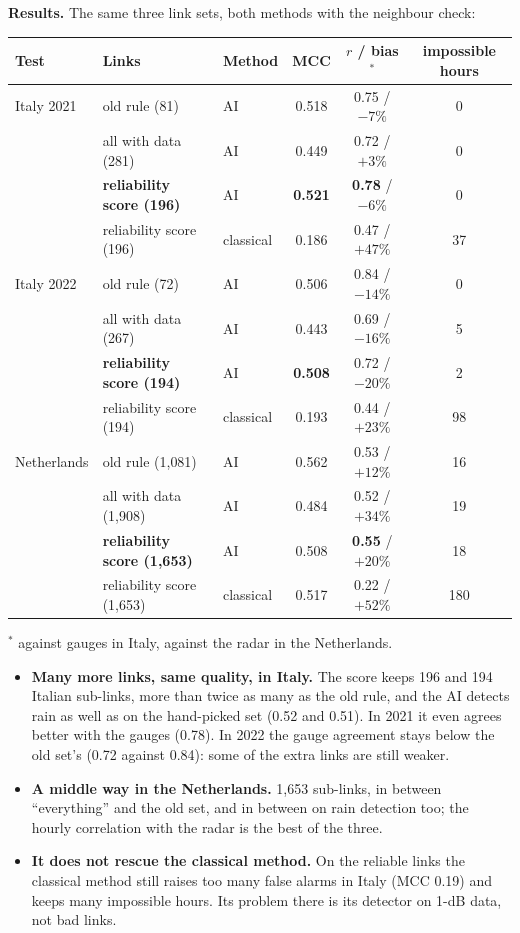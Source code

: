 \textbf{Results.} The same three link sets, both methods with the neighbour check:
\begin{center}\footnotesize\setlength{\tabcolsep}{4pt}
\begin{tabular}{lllccc}
\toprule
Test & Links & Method & MCC & $r$ / bias$^{*}$ & impossible hours\\
\midrule
Italy 2021 & old rule (81) & AI & 0.518 & 0.75 / $-7\%$ & 0\\
           & all with data (281) & AI & 0.449 & 0.72 / $+3\%$ & 0\\
           & \textbf{reliability score (196)} & AI & \textbf{0.521} & \textbf{0.78} / $-6\%$ & 0\\
           & reliability score (196) & classical & 0.186 & 0.47 / $+47\%$ & 37\\
\midrule
Italy 2022 & old rule (72) & AI & 0.506 & 0.84 / $-14\%$ & 0\\
           & all with data (267) & AI & 0.443 & 0.69 / $-16\%$ & 5\\
           & \textbf{reliability score (194)} & AI & \textbf{0.508} & 0.72 / $-20\%$ & 2\\
           & reliability score (194) & classical & 0.193 & 0.44 / $+23\%$ & 98\\
\midrule
Netherlands & old rule (1{,}081) & AI & 0.562 & 0.53 / $+12\%$ & 16\\
            & all with data (1{,}908) & AI & 0.484 & 0.52 / $+34\%$ & 19\\
            & \textbf{reliability score (1{,}653)} & AI & 0.508 & \textbf{0.55} / $+20\%$ & 18\\
            & reliability score (1{,}653) & classical & 0.517 & 0.22 / $+52\%$ & 180\\
\bottomrule
\end{tabular}

\smallskip
$^{*}$ against gauges in Italy, against the radar in the Netherlands.
\end{center}

\begin{itemize}
\item \textbf{Many more links, same quality, in Italy.} The score keeps 196 and 194 Italian sub-links, more than twice as
many as the old rule, and the AI detects rain as well as on the hand-picked set (0.52 and 0.51). In 2021 it even agrees
better with the gauges (0.78). In 2022 the gauge agreement stays below the old set's (0.72 against 0.84): some of the
extra links are still weaker.
\item \textbf{A middle way in the Netherlands.} 1{,}653 sub-links, in between ``everything'' and the old set, and in between
on rain detection too; the hourly correlation with the radar is the best of the three.
\item \textbf{It does not rescue the classical method.} On the reliable links the classical method still raises too many
false alarms in Italy (MCC 0.19) and keeps many impossible hours. Its problem there is its detector on 1-dB data, not
bad links.
\end{itemize}

